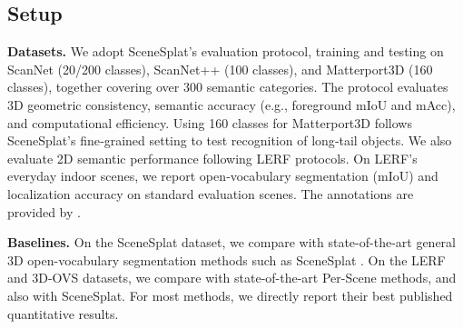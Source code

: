 \documentclass[runningheads]{llncs}
\begin{document}
\subsection{Setup}
\noindent\textbf{Datasets.}
We adopt SceneSplat’s evaluation protocol, training and testing on ScanNet (20/200 classes), ScanNet++ (100 classes), and Matterport3D (160 classes), together covering over 300 semantic categories. The protocol evaluates 3D geometric consistency, semantic accuracy (e.g., foreground mIoU and mAcc), and computational efficiency. Using 160 classes for Matterport3D follows SceneSplat’s fine‑grained setting to test recognition of long‑tail objects. 
We also evaluate 2D semantic performance following LERF\cite{lerf2023} protocols. On LERF’s everyday indoor scenes, we report open‑vocabulary segmentation (mIoU) and localization accuracy on standard evaluation scenes.
The annotations are provided by \cite{qin2024langsplat}.

\noindent\textbf{Baselines.}
On the SceneSplat dataset, we compare with state-of-the-art general 3D open-vocabulary segmentation methods such as SceneSplat \cite{li2025scenesplat,lee2025mosaic3d,jiang2024open,yang2024regionplc,ding2022language,peng2023openscene}. On the LERF and 3D-OVS datasets, we compare with state-of-the-art Per-Scene methods\cite{drsplat25,cheng2024occamslgssimpleapproach}, and also with SceneSplat. For most methods, we directly report their best published quantitative results.
\end{document}
